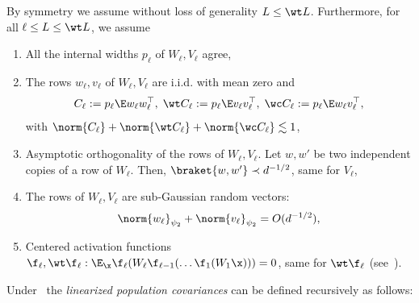 \begin{assumption}\label{corr rainbow}
    By symmetry we assume without loss of generality $L\le \wt L$. Furthermore, for all \(\ell \leq L \leq \wt L\), we assume
    \begin{enumerate}[label=(\alph*)]
        \item All the internal widths $p_\ell$ of $W_\ell,V_\ell$ agree,
        \item The rows $w_\ell,v_\ell$ of $W_\ell,V_\ell$ are i.i.d. with mean zero and 
        \begin{equation*}
        C_\ell := p_\ell \E w_\ell w_\ell^\top, \; \wt C_\ell:=p_\ell\E v_\ell v_\ell^\top,\; \wc C_\ell:=p_\ell\E w_\ell v_\ell^\top,
        \end{equation*}
        with \(\norm{C_\ell} + \norm{\wt C_\ell} + \norm{\wc C_\ell}\lesssim 1\),
        \item Asymptotic orthogonality of the rows of \(W_\ell, V_\ell\). Let \(w, w'\) be two independent copies of a row of \(W_\ell\). Then, \(\braket{w, w'} \prec d^{-1/2}\), same for \(V_\ell\),
        \item The rows of \(W_\ell, V_\ell\) are sub-Gaussian random vectors: 
        \begin{equation}
            \norm{w_\ell}_{\psi_2} + \norm{v_\ell}_{\psi_2} = O(d^{-1/2}),
        \end{equation}
        \item Centered activation functions \(\f_\ell, \wt \f_\ell: \E_{\x} \f_{\ell}(W_{\ell} \f_{\ell - 1}(\ldots \f_1(W_1 \x))) = 0\), same for \(\wt \f_\ell\) (see~).
    \end{enumerate}
\end{assumption}
Under~ the \emph{linearized population covariances} can be defined recursively as follows:
